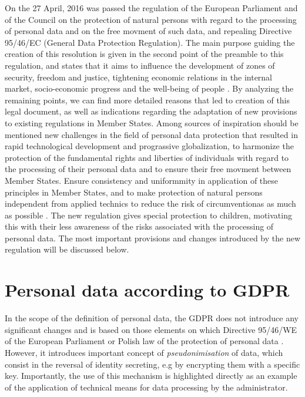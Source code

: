\documentclass[en, noamssymb]{mgr}
\begin{document}
On the 27 April, 2016 was passed the regulation of the European Parliament and of the Council on the protection of natural persons with regard to the processing of personal data and on the free movment of such data, and repealing Directive 95/46/EC (General Data Protection Regulation). The main purpose guiding the creation of this resolution is given in the second point of the preamble to this regulation, and states that it aims to influence the development of zones of security, freedom and justice, tightening economic relations in the internal market, socio-economic progress and the well-being of people \cite{rodo_preambula}. By analyzing the remaining points, we can find more detailed reasons that led to creation of this legal document, as well as indications regarding the adaptation of new provisions to existing regulations in Member States. Among sources of inspiration should be mentioned new challenges in the field of personal data protection that resulted in rapid technological development and prograssive globalization, to harmonize the protection of the fundamental rights and liberties of individuals with regard to the processing of their personal data and to ensure their free movment between Member States. Ensure consistency and uniformmity in application of these principles in Member States, and to make protection of natural persons independent from applied technics to reduce the risk of circumventionas as much as possible \cite{rodo_preambula}. The new regulation gives special protection to children, motivating this with their less awareness of the risks associated with the processing of personal data. The most important provisions and changes introduced by the new regulation will be discussed below.

\section{Personal data according to GDPR}

In the scope of the definition of personal data, the GDPR does not introduce any significant changes and is based on those elements on which Directive 95/46/WE of the European Parliament \cite{95/46/we} or Polish law of the protection of personal data \cite{uodo}. However, it introduces important concept of \textit{pseudonimisation} of data, which consist in the reversal of identity secreting, e.g by encrypting them with a specific key. Importantly, the use of this mechanism is highlighted directly as an example of the application of technical means for data processing by the administrator.
\end{document}
